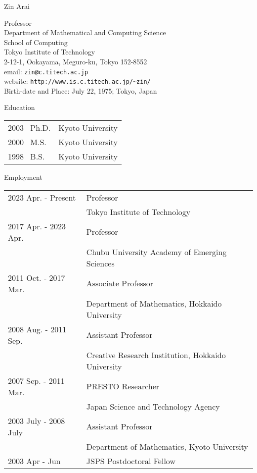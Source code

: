 \documentclass[11pt]{jsarticle}
\begin{document}
\thispagestyle{empty}

\begin{center}
{\LARGE \textrm{Zin Arai}}\\
\end{center}

\bigskip
\begin{flushleft}
Professor\\
Department of Mathematical and Computing Science\\
School of Computing\\
Tokyo Institute of Technology\\
2-12-1, Ookayama, Meguro-ku, Tokyo 152-8552\\
email: \texttt{zin@c.titech.ac.jp}\\
website: \texttt{http://www.is.c.titech.ac.jp/\textasciitilde zin/}\\
Birth-date and Place: July 22, 1975; Tokyo, Japan
\end{flushleft}

\bigskip
\bigskip

\begin{center}
 {\large \textsf{Education}}
\end{center}
\noindent
\begin{tabularx}{23cm}{ll}
2003 \ Ph.D. & Kyoto University\\
2000 \ M.S. & Kyoto University\\
1998 \ B.S. & Kyoto University\\
\end{tabularx}

\bigskip
\bigskip

\begin{center}
 {\large \textsf{Employment}}
\end{center}
\noindent
\begin{tabularx}{23cm}{ll}
2023 Apr. - Present & Professor\\
& Tokyo Institute of Technology\\

2017 Apr. - 2023 Apr. & Professor\\
& Chubu University Academy of Emerging Sciences\\

2011 Oct. - 2017 Mar. & Associate Professor\\
& Department of Mathematics, Hokkaido University \\

2008 Aug. - 2011 Sep. & Assistant Professor\\
& Creative Research Institution, Hokkaido University \\

2007 Sep. - 2011 Mar. & PRESTO Researcher\\
& Japan Science and Technology Agency \\

2003 July - 2008 July & Assistant Professor\\
& Department of Mathematics, Kyoto University \\

2003 Apr - Jun & JSPS Postdoctoral Fellow\\ 
\end{tabularx}
\end{document}
